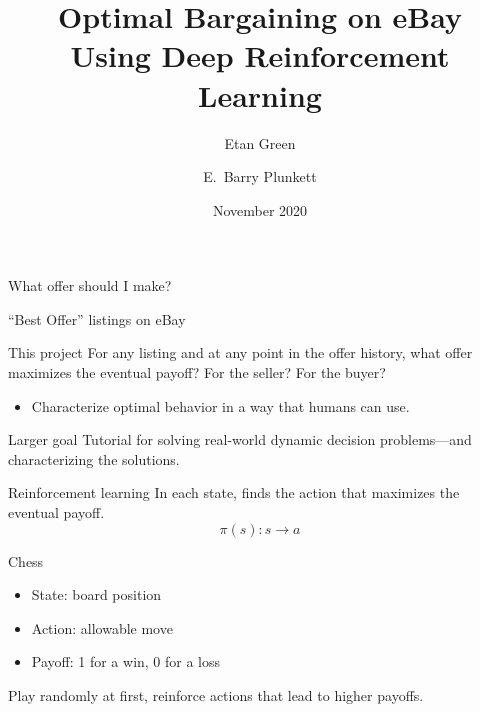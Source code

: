 \documentclass{beamer}
\title{Optimal Bargaining on eBay \\Using Deep Reinforcement Learning}
\author[Green, Plunkett]{Etan Green\inst{1} \and E.~Barry Plunkett\inst{1,2}}
\institute{
  \inst{1}%
  University of Pennsylvania
  \and
  \inst{2}%
  D.~E.~Shaw
}
\date{November 2020}
\begin{document}
\frame{\titlepage}

\begin{frame}
	What offer should I make?
\end{frame}

\begin{frame}{``Best Offer'' listings on eBay}

\end{frame}

\begin{frame}{This project}
	For any listing and at any point in the offer history, what offer maximizes the eventual payoff? For the seller? For the buyer?
	\begin{itemize}
		\item Characterize optimal behavior in a way that humans can use.
	\end{itemize}
\end{frame}

%

\begin{frame}{Larger goal}
	Tutorial for solving real-world dynamic decision problems---and characterizing the solutions.
\end{frame}

\begin{frame}{Reinforcement learning}
	In each state, finds the action that maximizes the eventual payoff.
	$$\pi(s): s \rightarrow a$$
\end{frame}

\begin{frame}{Chess}
	\begin{itemize}
		\item State: board position
		\item Action: allowable move
		\item Payoff: 1 for a win, 0 for a loss
	\end{itemize}
	\vspace{5mm}
	Play randomly at first, reinforce actions that lead to higher payoffs.
\end{frame}
\end{document}
